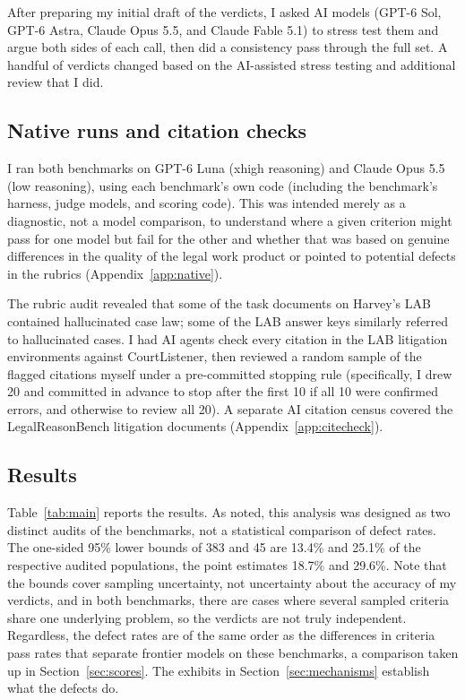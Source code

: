 \documentclass[11pt]{article}
\newcommand{\labDefectiveLB}{383}
\newcommand{\labDefectivePointShare}{18.7}
\newcommand{\labDefectiveShare}{13.4}
\newcommand{\lrbDefectiveLB}{45}
\newcommand{\lrbDefectiveShareLB}{25.1}
\newcommand{\lrbDefectivePointShare}{29.6}
\begin{document}
After preparing my initial draft of the verdicts, I asked AI models (GPT-6 Sol, GPT-6 Astra, Claude Opus 5.5, and Claude Fable 5.1) to stress test them and argue both sides of each call, then did a consistency pass through the full set. A handful of verdicts changed based on the AI-assisted stress testing and additional review that I did.

\subsection{Native runs and citation checks}

I ran both benchmarks on GPT-6 Luna (xhigh reasoning) and Claude Opus 5.5 (low reasoning), using each benchmark's own code (including the benchmark's harness, judge models, and scoring code). This was intended merely as a diagnostic, not a model comparison, to understand where a given criterion might pass for one model but fail for the other and whether that was based on genuine differences in the quality of the legal work product or pointed to potential defects in the rubrics (Appendix~\ref{app:native}).

The rubric audit revealed that some of the task documents on Harvey's LAB contained hallucinated case law; some of the LAB answer keys similarly referred to hallucinated cases. I had AI agents check every citation in the LAB litigation environments against CourtListener, then reviewed a random sample of the flagged citations myself under a pre-committed stopping rule (specifically, I drew 20 and committed in advance to stop after the first 10 if all 10 were confirmed errors, and otherwise to review all 20). A separate AI citation census covered the LegalReasonBench litigation documents (Appendix~\ref{app:citecheck}).

\subsection{Results}
\label{sec:results}

Table~\ref{tab:main} reports the results. As noted, this analysis was designed as two distinct audits of the benchmarks, not a statistical comparison of defect rates. The one-sided 95\% lower bounds of \labDefectiveLB{} and \lrbDefectiveLB{} are \labDefectiveShare\% and \lrbDefectiveShareLB\% of the respective audited populations, the point estimates \labDefectivePointShare\% and \lrbDefectivePointShare\%. Note that the bounds cover sampling uncertainty, not uncertainty about the accuracy of my verdicts, and in both benchmarks, there are cases where several sampled criteria share one underlying problem, so the verdicts are not truly independent. Regardless, the defect rates are of the same order as the differences in criteria pass rates that separate frontier models on these benchmarks, a comparison taken up in Section~\ref{sec:scores}. The exhibits in Section~\ref{sec:mechanisms} establish what the defects do.
\end{document}
